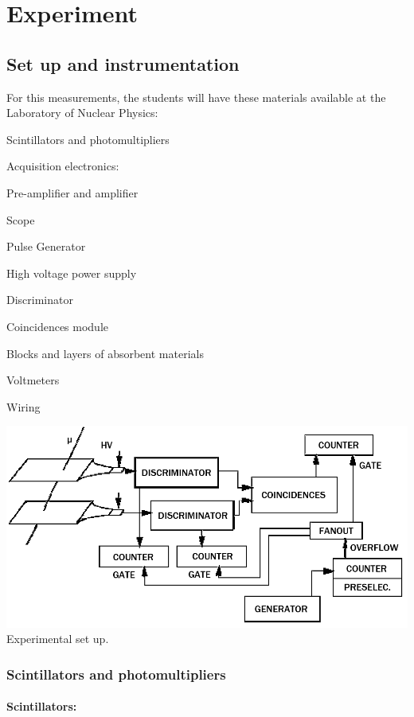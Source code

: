\chapter{Experiment}\label{chap:exp}


\section{Set up and instrumentation}

For this measurements, the students will have these materials available at the Laboratory of Nuclear Physics:
	\bi
		\item Scintillators and photomultipliers
		\item Acquisition electronics:
		\bi
			\item Pre-amplifier and amplifier
			\item Scope
			\item Pulse Generator
			\item High voltage power supply
			\item Discriminator
			\item Coincidences module
		\ei
		\item Blocks and layers of absorbent materials
		\item Voltmeters
		\item Wiring
	\ei

	\bfi[H]
		\bc
			\includegraphics[width=\textwidth]{img/setup.png}\\[12pt]
			\caption[Experimental set up.]{Experimental set up.}\label{fig:setup}
		\ec
	\efi



	\subsection{Scintillators and photomultipliers}

		\subsubsection{Scintillators:} 

